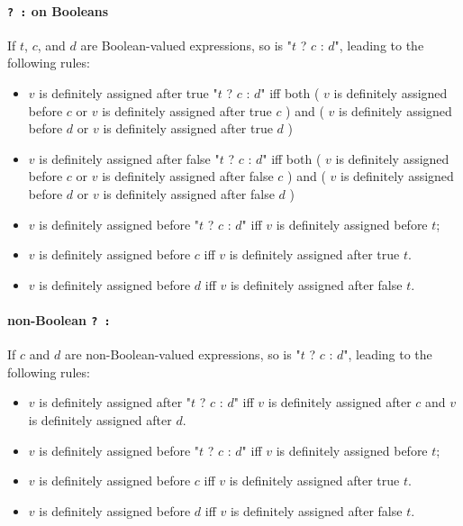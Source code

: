\paragraph{{\tt ? :} on Booleans}
If $t$, $c$, and $d$ are Boolean-valued expressions, so is 
\xcdmath"$t$ ? $c$ : $d$", 
leading to the following rules: 
\begin{itemize}
\item  $v$ is definitely assigned after true \xcdmath"$t$ ? $c$ : $d$" 
       iff both
       ( $v$ is definitely assigned before $c$ or  $v$ is definitely assigned
       after true $c$ )
       and
       ( $v$ is definitely assigned before $d$ or  $v$ is definitely assigned
       after true $d$ )

\item  $v$ is definitely assigned after false \xcdmath"$t$ ? $c$ : $d$" 
       iff both
       ( $v$ is definitely assigned before $c$ or  $v$ is definitely assigned
       after false $c$ )
       and
       ( $v$ is definitely assigned before $d$ or  $v$ is definitely assigned
       after false $d$ )
\item   $v$ is definitely assigned before \xcdmath"$t$ ? $c$ : $d$" 
       iff  $v$ is definitely assigned before $t$;
\item $v$ is definitely assigned before $c$ iff  $v$ is definitely assigned
      after true $t$.
\item $v$ is definitely assigned before $d$ iff  $v$ is definitely assigned
      after false $t$.
\end{itemize}


\paragraph{non-Boolean {\tt ? :}}
If 
$c$ and $d$ are non-Boolean-valued expressions, so is 
\xcdmath"$t$ ? $c$ : $d$", leading to the following rules: 
\begin{itemize}
\item  $v$ is definitely assigned after \xcdmath"$t$ ? $c$ : $d$"
       iff  $v$ is definitely assigned after $c$ and $v$ is definitely
       assigned after $d$.
\item   $v$ is definitely assigned before \xcdmath"$t$ ? $c$ : $d$" 
       iff  $v$ is definitely assigned before $t$;
\item $v$ is definitely assigned before $c$ iff  $v$ is definitely assigned
      after true $t$.
\item $v$ is definitely assigned before $d$ iff  $v$ is definitely assigned
      after false $t$.
\end{itemize}

